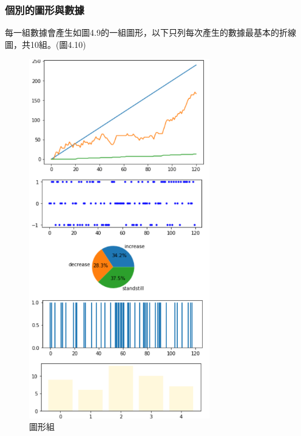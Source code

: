 \subsubsection{個別的圖形與數據}
每一組數據會產生如圖4.9的一組圖形，以下只列每次產生的數據最基本的折線圖，共10組。(圖4.10)
	\begin{figure}[H] 
	\centering 
	\includegraphics[width=0.7\textwidth]{4_5.png} 
	\caption{圖形組} 
	\label{Fig.4.5} 
	\end{figure}
